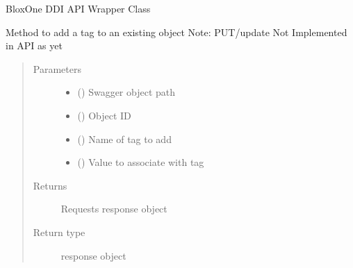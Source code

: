 \documentclass[letterpaper,10pt,english]{sphinxmanual}
\begin{document}
\begin{fulllineitems}
\label{\detokenize{b1ddi-class:bloxone.b1ddi}}
\sphinxAtStartPar
BloxOne DDI API Wrapper Class

\begin{fulllineitems}
\label{\detokenize{b1ddi-class:bloxone.b1ddi.add_tag}}
\sphinxAtStartPar
Method to add a tag to an existing object
Note: PUT/update Not Implemented in API as yet
\begin{quote}\begin{description}
\item[{Parameters}] \leavevmode\begin{itemize}
\item {} 
\sphinxAtStartPar
{} () \textendash{} Swagger object path

\item {} 
\sphinxAtStartPar
{} () \textendash{} Object ID

\item {} 
\sphinxAtStartPar
{} () \textendash{} Name of tag to add

\item {} 
\sphinxAtStartPar
{} () \textendash{} Value to associate with tag

\end{itemize}

\item[{Returns}] \leavevmode
\sphinxAtStartPar
Requests response object

\item[{Return type}] \leavevmode
\sphinxAtStartPar
response object


\end{description}
\end{quote}
\end{fulllineitems}
\end{fulllineitems}
\end{document}
